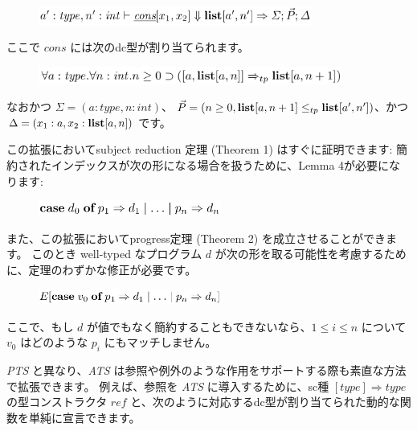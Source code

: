 \documentclass[submit,techreq,noauthor,onecolumn]{ipsj}
\begin{document}
\begin{figure}[h]
\centering
\includegraphics[width=9cm]{img/infig3_lemma4_judgement.png}
\end{figure}

\noindent ここで \underline{$cons$} には次のdc型が割り当てられます。

\begin{figure}[h]
\centering
\includegraphics[width=10cm]{img/infig3_lemma4_cons_dctype.png}
\end{figure}

\noindent なおかつ $\Sigma = (a:type, n:int)$、 $\vec{P} = (n \geq 0, {\bf list}[a,n+1] \leq_{tp} {\bf list}[a',n'])$、かつ $\Delta = (x_1:a, x_2:{\bf list}[a,n])$ です。

この拡張においてsubject reduction 定理 (Theorem 1) はすぐに証明できます:
簡約されたインデックスが次の形になる場合を扱うために、Lemma 4が必要になります:

\begin{figure}[h]
\centering
\includegraphics[width=6cm]{img/infig3_lemma4_theorem1.png}
\end{figure}

\noindent また、この拡張においてprogress定理 (Theorem 2) を成立させることができます。
このとき well-typed なプログラム $d$ が次の形を取る可能性を考慮するために、定理のわずかな修正が必要です。

\begin{figure}[h]
\centering
\includegraphics[width=6cm]{img/infig3_lemma4_theorem2.png}
\end{figure}

\noindent ここで、もし $d$ が値でもなく簡約することもできないなら、$1 \leq i \leq n$ について $v_0$ はどのような $p_i$ にもマッチしません。

{\it PTS} と異なり、{\it ATS} は参照や例外のような作用をサポートする際も素直な方法で拡張できます。
例えば、参照を {\it ATS} に導入するために、sc種 $[type] \Rightarrow type$ の型コンストラクタ $ref$ と、次のように対応するdc型が割り当てられた動的な関数を単純に宣言できます。
\end{document}
